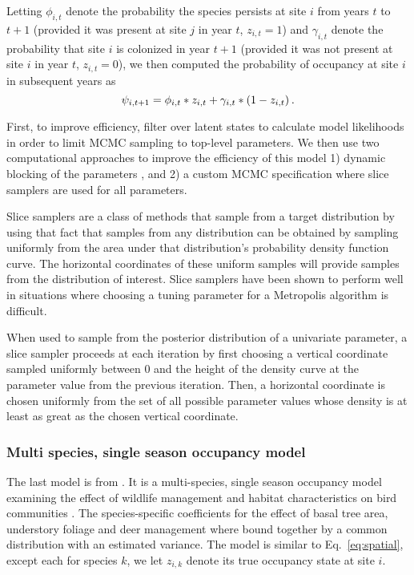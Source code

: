 \documentclass[12pt]{article}
\begin{document}
Letting $\phi_{i,t}$ denote the probability the species persists at
site $i$ from years $t$ to $t+1$ (provided it was present at site $j$
in year $t$, $z_{i,t}=1$) and $\gamma_{i,t}$ denote the
probability that site $i$ is colonized in year $t+1$
(provided it was not present at site $i$ in year $t$, $z_{i,t}=0$),
we then computed the probability of occupancy  at site
$i$ in subsequent years as
%
\begin{equation}
  \label{eq:occupancy2}
  \psi_{i,t+1} =
  \phi_{i,t} * z_{i,t} + \gamma_{i,t} * (1-z_{i,t})\hspace{0.2em}.
\end{equation}
%

First, to improve efficiency, filter over latent states
to calculate model likelihoods in order to limit MCMC sampling to
top-level parameters. We then use two computational approaches to
improve the efficiency of this model 1) dynamic blocking of the
parameters \citep{turek2016efficient}, and 2) a custom MCMC
specification where slice samplers \cite{neal-03} are used for all parameters.

Slice samplers are a class of methods that sample from a target distribution  by using that fact that samples from any distribution can be obtained by sampling uniformly from the area under that distribution's probability density function curve.  The horizontal coordinates of these uniform samples will provide samples from the distribution of interest.  Slice samplers have been shown to perform well in situations where choosing a tuning parameter for a Metropolis algorithm is difficult.   

When used to sample from the posterior distribution of a univariate parameter, a slice sampler proceeds at each iteration by first choosing a vertical coordinate sampled uniformly between 0 and the height of the density curve at the parameter value from the previous iteration.  Then, a horizontal coordinate is chosen uniformly from the set of all possible parameter values whose density is at least as great as the chosen vertical coordinate.

\subsubsection*{Multi species, single season occupancy model}
\label{sec:msss}

The last model is from \citep{zipkin2010multi}. It is a multi-species,
single season occupancy model examining the effect of wildlife
management and habitat characteristics on bird communities
\citep{zipkin2010multi}. The species-specific coefficients for the
effect of basal tree area, understory foliage and deer management
where bound together by a common distribution with an estimated
variance. The model is similar to Eq.~\ref{eq:spatial}, except each for
species $k$, we let $z_{i,k}$ denote its true occupancy state at site
$i$.
 
\end{document}
